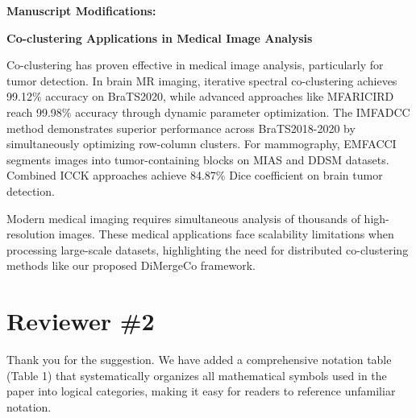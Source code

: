 \documentclass{ar2rc}
\begin{document}
\textbf{Manuscript Modifications:}

\textbf{Co-clustering Applications in Medical Image Analysis}

Co-clustering has proven effective in medical image analysis, particularly for tumor detection. In brain MR imaging, iterative spectral co-clustering achieves 99.12\% accuracy on BraTS2020\cite{farnoosh2024DevelopmentUnsupervisedPseudodeep}, while advanced approaches like MFARICIRD reach 99.98\% accuracy through dynamic parameter optimization\cite{farnoosh2025PseudodeepUnsupervisedModelbased}. The IMFADCC method demonstrates superior performance across BraTS2018-2020 by simultaneously optimizing row-column clusters\cite{farnoosh2024BrainMagneticResonance}. For mammography, EMFACCI segments images into tumor-containing blocks on MIAS and DDSM datasets\cite{farnoosh2024NovelApproachAutomatic}. Combined ICCK approaches achieve 84.87\% Dice coefficient on brain tumor detection\cite{farnoosh2022ApplicationModifiedCombinational}.

Modern medical imaging requires simultaneous analysis of thousands of high-resolution images. These medical applications face scalability limitations when processing large-scale datasets, highlighting the need for distributed co-clustering methods like our proposed DiMergeCo framework.


\section{Reviewer \#2}


\AR Thank you for the suggestion. We have added a comprehensive notation table (Table 1) that systematically organizes all mathematical symbols used in the paper into logical categories, making it easy for readers to reference unfamiliar notation.
\end{document}
